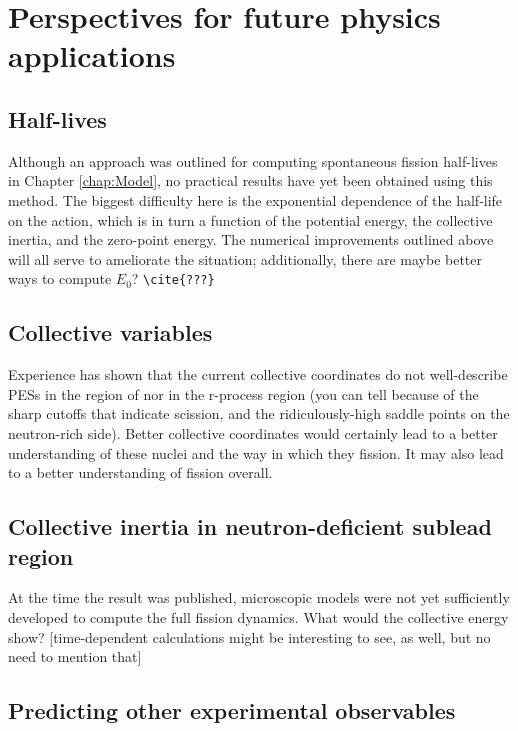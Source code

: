 \section{Perspectives for future physics applications}

\subsection{Half-lives}

Although an approach was outlined for computing spontaneous fission half-lives in Chapter \ref{chap:Model}, no practical results have yet been obtained using this method. The biggest difficulty here is the exponential dependence of the half-life on the action, which is in turn a function of the potential energy, the collective inertia, and the zero-point energy. The numerical improvements outlined above will all serve to ameliorate the situation; additionally, there are maybe better ways to compute $E_0$? \verb|\cite{???}|

\subsection{Collective variables}

Experience has shown that the current collective coordinates do not well-describe PESs in the region of {\Pt} nor in the r-process region (you can tell because of the sharp cutoffs that indicate scission, and the ridiculously-high saddle points on the neutron-rich side). Better collective coordinates would certainly lead to a better understanding of these nuclei and the way in which they fission. It may also lead to a better understanding of fission overall.

\subsection{Collective inertia in neutron-deficient sublead region}

At the time the {\Hg} result was published, microscopic models were not yet sufficiently developed to compute the full fission dynamics. What would the collective energy show? [time-dependent calculations might be interesting to see, as well, but no need to mention that]

\subsection{Predicting other experimental observables}


